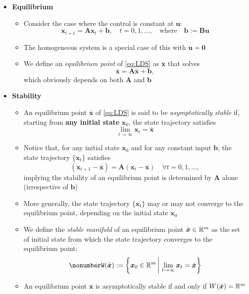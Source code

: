 \documentclass[12pt,a4paper]{article}
\begin{document}
\begin{itemize}
\item \textbf{Equilibrium}
  \begin{itemize}
  \item Consider the case where the control is constant at $\bm{u}$:
    \begin{equation}\label{eq:LDS}%
      \bm{x}_{t+1} = \bm{A}\bm{x}_{t} + \bm{b},
      \quad t = 0, 1, \ldots,
      \quad\text{where}\quad
      \bm{b}:=\bm{B}\bm{u}
    \end{equation}
  \item The homogeneous system is a special case of this with $\bm{u}=\bm{0}$
  \item We define an \emph{equilibrium point} of \eqref{eq:LDS} as $\bar{\bm{x}}$ that solves
    \begin{equation}\nonumber%
      \bar{\bm{x}} = \bm{A}\bar{\bm{x}} + \bm{b},
    \end{equation}
    which obviously depends on both $\bm{A}$ and $\bm{b}$
  \end{itemize}

\item \textbf{Stability}
  \begin{itemize}

  \item An equilibrium point $\bar{\bm{x}}$ of \eqref{eq:LDS}
    is said to be \emph{asymptotically stable} if,
    starting from \textbf{any initial state} $\bm{x}_{0}$,
    the state trajectory satisfies
    \begin{equation}\nonumber%
      \lim_{t\to\infty}\bm{x}_{t}=\bar{\bm{x}}
    \end{equation}
  \item Notice that, for any initial state $\bm{x}_{0}$ and for any constant input $\bm{b}$,
    the state trajectory $\{\bm{x}_{t}\}$ satisfies
    \begin{equation}\nonumber%
      (\bm{x}_{t+1} - \bar{\bm{x}}) = \bm{A}(\bm{x}_{t} - \bar{\bm{x}}) \quad \forall t = 0, 1, \ldots,
    \end{equation}
    implying the stability of an equilibrium point is determined by $\bm{A}$ alone (irrespective of $\bm{b}$)%
  \item More generally,
    the state trajectory $\{\bm{x}_{t}\}$ may or may not converge to the equilibrium point,
    depending on the initial state $\bm{x}_{0}$
    
  \item We define the \emph{stable manifold} of an equilibrium point $\bar{\bm{x}}\in \mathbb{R}^{m}$
    as the set of initial state from which the state trajectory converges to the equilibrium point:
    \begin{equation}\nonumber%
      W(\bar{\bm{x}}) := \left\{ \bm{x}_{0}\in \R^{m} \,\bigg|\, \lim_{t\to \infty}\bm{x}_{t} = \bar{\bm{x}} \right\}
    \end{equation}
  \item An equilibrium point $\bar{\bm{x}}$ is asymptotically stable
    if and only if $W(\bar{\bm{x}}) = \mathbb{R}^{m}$
  \end{itemize}

\end{itemize}
\end{document}
